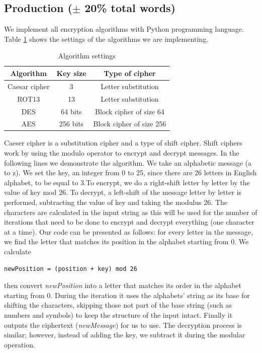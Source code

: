 \subsection{Production ($\pm$ 20\% total words)}

We implement all encryption algorithms with Python programming language. Table \ref{algorithms} shows the settings of the algorithms we are implementing.

\begin{table}[h!]
\begin{tabular}{|c|c|c|}
\hline
\textbf{Algorithm} & \textbf{Key size} & \textbf{Type of cipher}  \\ \hline
Caesar cipher      & 3                 & Letter substitution      \\ \hline
ROT13              & 13                & Letter substitution      \\ \hline
DES                & 64 bits           & Block cipher of size 64  \\ \hline
AES                & 256 bits          & Block cipher of size 256 \\ \hline
\end{tabular}
\caption{Algorithm settings}
\label{algorithms}
\end{table}

Caeser cipher is a substitution cipher and a type of shift cipher. Shift ciphers work by using the modulo operator to encrypt and decrypt messages. In the following lines we demonstrate the algorithm. We take an alphabetic message (a to z). We set the key, an integer from 0 to 25, since there are 26 letters in English alphabet, to be equal to 3.To encrypt, we do a right-shift letter by letter by the value of key mod 26. To decrypt, a left-shift of the message letter by letter is performed, subtracting the value of key and taking the modulus 26. The characters are calculated in the input string as this will be used for the number of iterations that need to be done to encrypt and decrypt everything (one character at a time). Our code can be presented as follows: for every letter in the message, we find the letter that matches its position in the alphabet starting from 0. We calculate
\begin{verbatim}
newPosition = (position + key) mod 26
\end{verbatim} 
then convert \textit{newPosition} into a letter that matches its order in the alphabet starting from 0. During the iteration it uses the alphabets' string as its base for shifting the characters, skipping those not part of the base string (such as numbers and symbols) to keep the structure of the input intact.
Finally it outputs the ciphertext (\textit{newMessage}) for us to use. The decryption process is similar; however, instead of adding the key, we subtract it during the modular operation.

